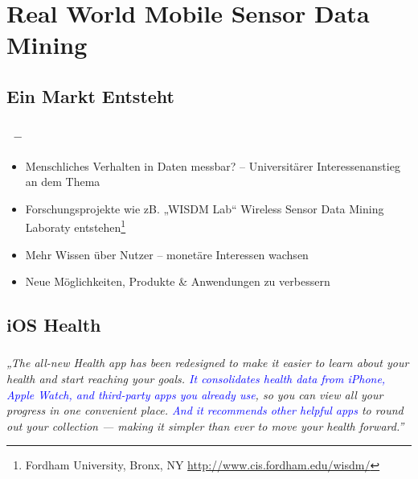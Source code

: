 \section{Real World Mobile Sensor Data Mining}

\subsection{Ein Markt Entsteht}

\begin{frame}
    \frametitle{\insertsubsection \ -- \cite{lockhart2011}}
    \begin{itemize}
        \setlength\itemsep{1em}
        \item Menschliches Verhalten in Daten messbar? -- Universitärer Interessenanstieg an dem Thema
        \item Forschungsprojekte wie zB. „WISDM Lab“ Wireless Sensor Data Mining Laboraty entstehen\footnote{Fordham University, Bronx, NY \url{http://www.cis.fordham.edu/wisdm/}}
        \vspace{0.7em}
        \item Mehr Wissen über Nutzer -- monetäre Interessen wachsen
        \item Neue Möglichkeiten, Produkte \& Anwendungen zu verbessern
    \end{itemize}
\end{frame}

\subsection{iOS Health}

\begin{frame}
    \frametitle{\insertsubsection}
    \center
    \Large
    \emph{„The all-new Health app has been redesigned to make it easier to learn about your health and start reaching your goals. \textcolor{blue}{It consolidates health data from iPhone, Apple Watch, and third-party apps you already use}, so you can view all your progress in one convenient place. \textcolor{blue}{And it recommends other helpful apps} to round out your collection — making it simpler than ever to move your health forward.”} \cite{iosHealth}
\end{frame}

